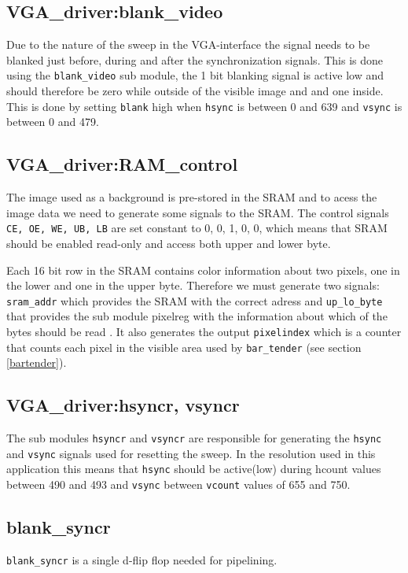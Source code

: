 \subsection{VGA\_driver:blank\_video}

Due to the nature of the sweep in the VGA-interface the signal needs to be blanked just before,
during and after the synchronization signals. This is done using the \verb=blank_video= sub module,
the 1 bit blanking signal is active low and should therefore be zero while outside of the visible image and
and one inside. This is done by setting \verb=blank= high when \verb=hsync= is between 0 and 639 and \verb=vsync= is between
0 and 479.    


\subsection{VGA\_driver:RAM\_control}
The image used as a background is pre-stored in the SRAM and to acess the image data we need to generate
some signals to the SRAM. The control signals \verb=CE, OE, WE, UB, LB= are set constant to
0, 0, 1, 0, 0, which means that SRAM should be enabled read-only and access both upper and lower byte.

Each 16 bit row in the SRAM contains color information about two pixels, one in the lower and one in the upper
byte. Therefore we must generate two signals: \verb=sram_addr= which provides the SRAM with the correct adress and 
\verb=up_lo_byte= that provides the sub module pixelreg with the information about which of the bytes should be read .
It also generates the output \verb=pixelindex= which is a counter that counts each pixel in the visible area used
by \verb=bar_tender= (see section \ref{bartender}).   

\subsection{VGA\_driver:hsyncr, vsyncr}
The sub modules \verb+hsyncr+ and \verb+vsyncr+ are responsible for generating the \verb=hsync= and \verb=vsync= signals used for resetting
the sweep. In the resolution used in this application this means that \verb=hsync= should be active(low) during 
hcount values between 490 and 493 and \verb=vsync= between \verb=vcount= values of 655 and 750.   

\subsection{blank\_syncr}
\verb=blank_syncr= is a single d-flip flop needed for pipelining.

